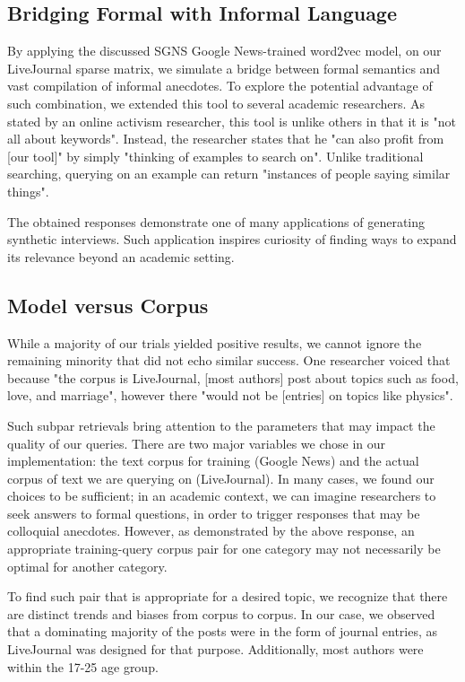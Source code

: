 \documentclass{sigchi}
\begin{document}
\subsection{Bridging Formal with Informal Language}
By applying the discussed SGNS Google News-trained word2vec model, on our LiveJournal sparse matrix, we simulate a bridge between formal semantics and vast compilation of informal anecdotes. To explore the potential advantage of such combination, we extended this tool to several academic researchers. As stated by an online activism researcher, this tool is unlike others in that it is "not all about keywords". Instead, the researcher states that he "can also profit from [our tool]" by simply "thinking of examples to search on". Unlike traditional searching, querying on an example can return "instances of people saying similar things". 

The obtained responses demonstrate one of many applications of generating synthetic interviews. Such application inspires curiosity of finding ways to expand its relevance beyond an academic setting. 

\subsection{Model versus Corpus}
While a majority of our trials yielded positive results, we cannot ignore the remaining minority that did not echo similar success. One researcher voiced that because "the corpus is LiveJournal, [most authors] post about topics such as food, love, and marriage", however there "would not be [entries] on topics like physics". 

Such subpar retrievals bring attention to the parameters that may impact the quality of our queries. There are two major variables we chose in our implementation: the text corpus for training (Google News) and the actual corpus of text we are querying on (LiveJournal). In many cases, we found our choices to be sufficient; in an academic context, we can imagine researchers to seek answers to formal questions, in order to trigger responses that may be colloquial anecdotes. However, as demonstrated by the above response, an appropriate training-query corpus pair for one category may not necessarily be optimal for another category.

To find such pair that is appropriate for a desired topic, we recognize that there are distinct trends and biases from corpus to corpus. In our case, we observed that a dominating majority of the posts were in the form of journal entries, as LiveJournal was designed for that purpose. Additionally, most authors were within the 17-25 age group.
\end{document}
